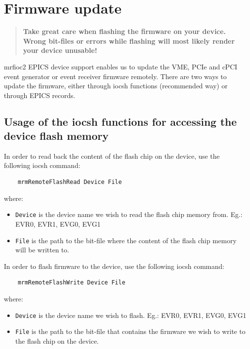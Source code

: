 \documentclass[12pt,a4paper]{article}
\let\stdsection\section
\renewcommand\section{\newpage\stdsection}
\begin{document}

\section{Firmware update}
\begin{quote}
\textbf{Take great care when flashing the firmware on your device. Wrong bit-files or errors while flashing will most likely render your device unusable!}
\end{quote}
mrfioc2 EPICS device support enables us to update the VME, PCIe and cPCI event generator or event receiver firmware remotely. There are two ways to update the firmware, either through iocsh functions (recommended way) or through EPICS records.


\subsection{Usage of the iocsh functions for accessing the device flash memory}
In order to read back the content of the flash chip on the device, use the following iocsh command:
\begin{verbatim}
	mrmRemoteFlashRead Device File
\end{verbatim}
where:
\begin{itemize}
	\item \texttt{Device} is the device name we wish to read the flash chip memory from. Eg.: EVR0, EVR1, EVG0, EVG1
	\item \texttt{File} is the path to the bit-file where the content of the flash chip memory will be written to.
\end{itemize}

In order to flash firmware to the device, use the following iocsh command:
\begin{verbatim}
	mrmRemoteFlashWrite Device File
\end{verbatim}
where:
\begin{itemize}
	\item \texttt{Device} is the device name we wish to flash. Eg.: EVR0, EVR1, EVG0, EVG1
	\item \texttt{File} is the path to the bit-file that contains the firmware we wish to write to the flash chip on the device.
\end{itemize}
\end{document}

